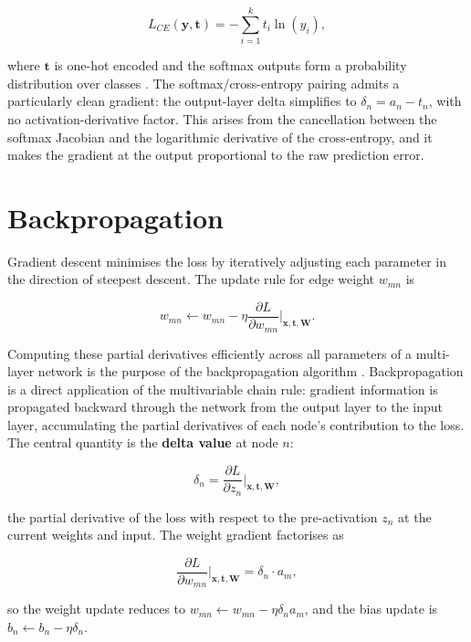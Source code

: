     \[
    L_{CE}(\mathbf{y}, \mathbf{t}) = -\sum_{i=1}^{k} t_i \ln(y_i),
    \]

    \noindent 
    where $\mathbf{t}$ is one-hot encoded and the softmax outputs form a probability distribution over classes \citep{goodfellow2016deep}. The softmax/cross-entropy pairing admits a particularly clean gradient: the output-layer delta simplifies to $\delta_n = a_n - t_n$, with no activation-derivative factor. This arises from the cancellation between the softmax Jacobian and the logarithmic derivative of the cross-entropy, and it makes the gradient at the output proportional to the raw prediction error. \\

    \section*{Backpropagation}

    Gradient descent minimises the loss by iteratively adjusting each parameter in the direction of steepest descent. The update rule for edge weight $w_{mn}$ is

    \[
    w_{mn} \leftarrow w_{mn} - \eta \frac{\partial L}{\partial w_{mn}}\bigg|_{\mathbf{x}, \mathbf{t}, \mathbf{W}}.
    \]

    \noindent 
    Computing these partial derivatives efficiently across all parameters of a multi-layer network is the purpose of the backpropagation algorithm \citep{rumelhart1986learning}. Backpropagation is a direct application of the
    multivariable chain rule: gradient information is propagated backward through the network from the output layer to the input layer, accumulating the partial derivatives of each node's contribution to the loss. \\

    \noindent 
    The central quantity is the \textbf{delta value} at node $n$:

    \[
    \delta_n = \frac{\partial L}{\partial z_n}\bigg|_{\mathbf{x}, \mathbf{t}, \mathbf{W}},
    \]

    \noindent 
    the partial derivative of the loss with respect to the pre-activation $z_n$ at the current weights and input. The weight gradient factorises as

    \[
    \frac{\partial L}{\partial w_{mn}}\bigg|_{\mathbf{x}, \mathbf{t}, \mathbf{W}} = \delta_n \cdot a_m,
    \]

    \noindent 
    so the weight update reduces to $w_{mn} \leftarrow w_{mn} - \eta \delta_n a_m$, and the bias update is $b_n \leftarrow b_n - \eta \delta_n$.


